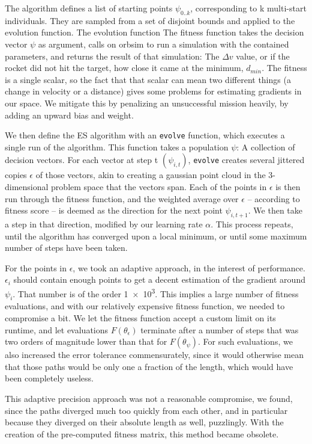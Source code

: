 The algorithm defines a list of starting points $\psi_{0..k}$, corresponding to k multi-start individuals. They are sampled from a set of disjoint bounds and applied to the evolution function. The evolution function  The fitness function takes the decision vector \(\psi\) as argument, calls on orbsim to run a simulation with the contained parameters, and returns the result of that simulation: The \(\Delta v\) value, or if the rocket did not hit the target, how close it came at the minimum, \(d_{min}\). The fitness is a single scalar, so the fact that that scalar can mean two different things (a change in velocity or a distance) gives some problems for estimating gradients in our space. We mitigate this by penalizing an unsuccessful mission heavily, by adding an upward bias and weight.

We then define the ES algorithm with an \texttt{evolve} function, which executes a single run of the algorithm. This function takes a population \(\psi\): A collection of decision vectors. For each vector at step t \((\psi_{i,t})\), \texttt{evolve} creates several jittered copies \(\epsilon\) of those vectors, akin to creating a gaussian point cloud in the 3-dimensional problem space that the vectors span. Each of the points in \(\epsilon\) is then run through the fitness function, and the weighted average over \(\epsilon\) -- according to fitness score -- is deemed as the direction for the next point \(\psi_{i,t+1}\). We then take a step in that direction, modified by our learning rate \(\alpha\). This process repeats, until the algorithm has converged upon a local minimum, or until some maximum number of steps have been taken.

For the points in \(\epsilon\), we took an adaptive approach, in the interest of performance. \(\epsilon_i\) should contain enough points to get a decent estimation of the gradient around \(\psi_i\). That number is of the order \num{1e3}. This implies a large number of fitness evaluations, and with our relatively expensive fitness function, we needed to compromise a bit. We let the fitness function accept a custom limit on its runtime, and let evaluations \(F(\theta_\epsilon)\) terminate after a number of steps that was two orders of magnitude lower than that for \(F(\theta_\psi)\). For such evaluations, we also increased the error tolerance commensurately, since it would otherwise mean that those paths would be only one a fraction of  the length, which would have been completely useless.

This adaptive precision approach was not a reasonable compromise, we found, since the paths diverged much too quickly from each other, and in particular because they diverged on their absolute length as well, puzzlingly. With the creation of the pre-computed fitness matrix, this method became obsolete.

